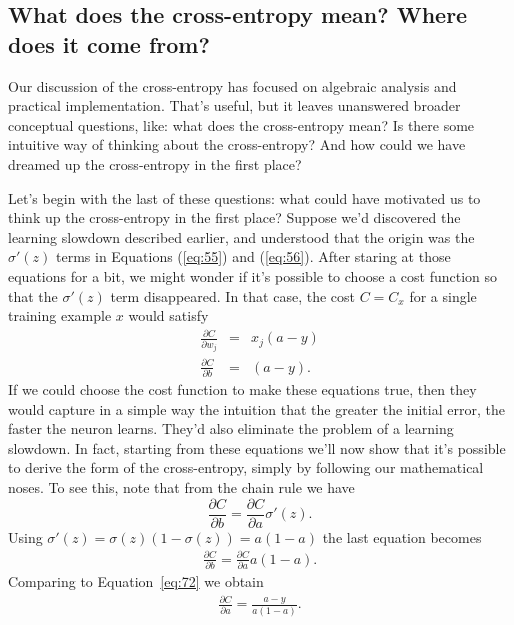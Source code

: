 \documentclass[a4paper,twoside,10pt]{book}
\begin{document}
\subsection{What does the cross-entropy mean? Where does it come from?}
Our discussion of the cross-entropy has focused on algebraic analysis and practical implementation. That's useful, but it leaves unanswered broader conceptual questions, like: what does the cross-entropy mean? Is there some intuitive way of thinking about the cross-entropy? And how could we have dreamed up the cross-entropy in the first place?

Let's begin with the last of these questions: what could have motivated us to think up the cross-entropy in the first place? Suppose we'd discovered the learning slowdown described earlier, and understood that the origin was the $\sigma'(z)$ terms in Equations (\ref{eq:55}) and (\ref{eq:56}). After staring at those equations for a bit, we might wonder if it's possible to choose a cost function so that the $\sigma'(z)$ term disappeared. In that case, the cost $C=C_x$ for a single training example $x$ would satisfy
\begin{eqnarray} 
\frac{\partial C}{\partial w_j} & = & x_j(a-y) \label{eq:71}\\
\frac{\partial C}{\partial b } & = & (a-y).
\label{eq:72}\end{eqnarray}
If we could choose the cost function to make these equations true, then they would capture in a simple way the intuition that the greater the initial error, the faster the neuron learns. They'd also eliminate the problem of a learning slowdown. In fact, starting from these equations we'll now show that it's possible to derive the form of the cross-entropy, simply by following our mathematical noses. To see this, note that from the chain rule we have
\begin{equation}
	\frac{\partial C}{\partial b} = \frac{\partial C}{\partial a} \sigma'(z).
	\label{eq:73}
\end{equation}
Using $\sigma'(z)=\sigma(z)(1−\sigma(z))=a(1−a)$ the last equation becomes
\begin{eqnarray}
\frac{\partial C}{\partial b} = \frac{\partial C}{\partial a} 
a(1-a).
\label{eq:74}\end{eqnarray}
Comparing to Equation~\ref{eq:72} we obtain
\begin{eqnarray}
\frac{\partial C}{\partial a} = \frac{a-y}{a(1-a)}. \label{eq:75}\end{eqnarray}
\end{document}
